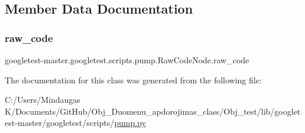 \subsection{Member Data Documentation}
\mbox{\label{classgoogletest-master_1_1googletest_1_1scripts_1_1pump_1_1_raw_code_node_a416a8c89b24886f21e0aea74f6074cb6}} 
\subsubsection{\texorpdfstring{raw\_code}{raw\_code}}
{\footnotesize\ttfamily googletest-\/master.\+googletest.\+scripts.\+pump.\+Raw\+Code\+Node.\+raw\+\_\+code}



The documentation for this class was generated from the following file\+:\begin{DoxyCompactItemize}
\item 
C\+:/\+Users/\+Mindaugas K/\+Documents/\+Git\+Hub/\+Obj\+\_\+\+Duomenu\+\_\+apdorojimas\+\_\+class/\+Obj\+\_\+test/lib/googletest-\/master/googletest/scripts/\mbox{\hyperlink{_obj__test_2lib_2googletest-master_2googletest_2scripts_2pump_8py}{pump.\+py}}\end{DoxyCompactItemize}
